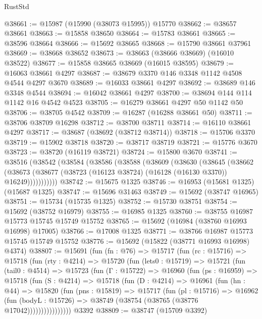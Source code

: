 \begin{lexlean}{RustStd}
\begin{coremodule}
@38661 := @15987 (@15990 (@38073 @15995)) @15770
@38662 := @38657 @38661
@38663 := @15858 @38650
@38664 := @15783 @38661
@38665 := @38596 @38664
@38666 := @15692 @38665
@38668 := @15790 @38661 @37961
@38669 := @38668 @38652
@38673 := @38663 (@38666 @38669) (@16010 @38522)
@38677 := @15858 @38665 @38669 (@16015 @38595)
@38679 := @16063 @38661 @4297
@38687 := @38679 @3370 @146 @3348 @1142 @4508 @4544 @4297 @3670
@38689 := @16033 @38661 @4297
@38692 := @38689 @146 @3348 @4544
@38694 := @16042 @38661 @4297
@38700 := @38694 @144 @114 @1142 @16 @4542 @4523
@38705 := @16279 @38661 @4297 @50 @1142 @50
@38706 := @38705 @4542
@38709 := @16287 (@16288 @38661 @50)
@38711 := @38706 @38709 @16298
@38712 := @38700 @38711
@38714 := @16110 @38661 @4297
@38717 := @38687 (@38692 (@38712 @38714))
@38718 := @15706 @3370
@38719 := @15902 @38718
@38720 := @38717 @38719
@38721 := @15776 @3670
@38723 := @38720 (@16119 @38721)
@38724 := @15800 @3670
@38741 := @38516
    (@38542
      (@38584
        (@38586
          (@38588
            (@38609
              (@38630
                (@38645
                  (@38662
                    (@38673
                      (@38677 (@38723 (@16123 @38724) (@16128 (@16130 @3370)) @16249)))))))))))
@38742 := @15675 @1325
@38746 := @16953 (@15681 @1325) (@15687 @1325)
@38747 := @15696 @31463
@38749 := @15692 (@38747 @16965)
@38751 := @15734 (@15735 @1325)
@38752 := @15730 @38751
@38754 := @15692 (@38752 @16979)
@38755 := @16985 @1325
@38760 := @38755 @16987 @15773 @15745 @15749 @15752
@38765 := @15692 (@16984 (@38760 @16993 @16998) @17005)
@38766 := @17008 @1325
@38771 := @38766 @16987 @15773 @15745 @15749 @15752
@38776 := @15692 (@15822 (@38771 @16993 @16998) @4374)
@38807 := @15691
    (fun (fn : @76) =>
    @15717
      (fun (rc : @15716) =>
      @15718
        (fun (rty : @4214) =>
        @15720
          (fun (lets0 : @15719) =>
          @15721
            (fun (tail0 : @4514) =>
            @15723
              (fun (Γ : @15722) =>
              @16960
                (fun (ps : @16959) =>
                @15718
                  (fun (S : @4214) =>
                  @15718
                    (fun (D : @4214) =>
                    @16961
                      (fun (hn : @44) =>
                      @15820
                        (fun (pns : @15819) =>
                        @15717
                          (fun (pl : @15716) =>
                          @16962
                            (fun (bodyL : @15726) =>
                            @38749 (@38754 (@38765 (@38776 @17042))))))))))))))))
    @3392
@38809 := @38747 (@15709 @3392)

\end{coremodule}
\end{lexlean}
